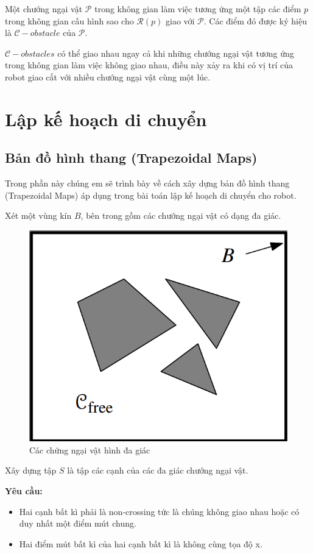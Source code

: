 \documentclass[a4paper,12pt]{report}
\begin{document}
Một chướng ngại vật $\mathcal{P}$ trong không gian làm việc tương ứng một tập các điểm $p$ trong không gian cấu hình sao cho $\mathcal{R}(p)$ giao với $\mathcal{P}$. Các điểm đó được ký hiệu là $\mathcal{C}-{obstacle}$ của $\mathcal{P}$.
\par $\mathcal{C}-obstacles$ có thể giao nhau ngay cả khi những chướng ngại vật tương ứng trong không gian làm việc không giao nhau, điều này xảy ra khi có vị trí của robot giao cắt với nhiều chướng ngại vật cùng một lúc.

\chapter{Lập kế hoạch di chuyển}
\section{Bản đồ hình thang (Trapezoidal Maps)}
Trong phần này chúng em sẽ trình bày về cách xây dựng bản đồ hình thang (Trapezoidal Maps) áp dụng trong bài toán lập kế hoạch di chuyển cho robot.
\par Xét một vùng kín $B$, bên trong gồm các chướng ngại vật có dạng đa giác. 
\begin{figure}[H]
\label{object_pic}
\centering
\includegraphics[scale=0.4]{normal.png}
\caption{Các chứng ngại vật hình đa giác}
\end{figure}
Xây dựng tập $S$ là tập các cạnh của các đa giác chướng ngại vật.

\textbf{Yêu cầu:} 
\begin{itemize}
\item Hai cạnh bất kì phải là non-crossing tức là chúng không giao nhau hoặc có duy nhất một điểm mút chung.
\item Hai điểm mút bất kì của hai cạnh bất kì là không cùng tọa độ x.
\end{itemize}
\end{document}
